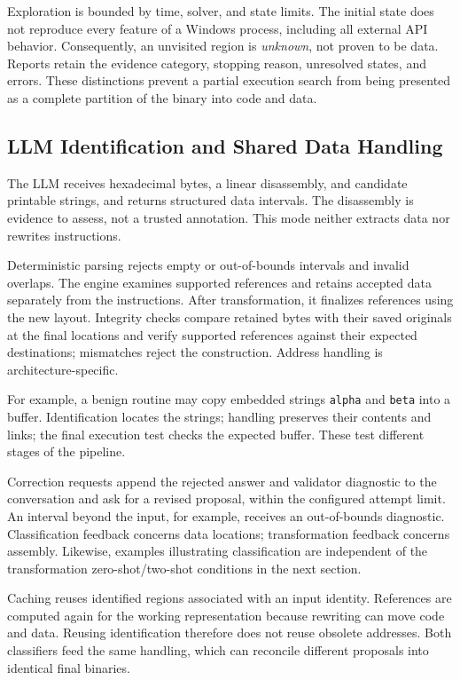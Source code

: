 Exploration is bounded by time, solver, and state limits. The initial state
does not reproduce every feature of a Windows process, including all
external API behavior. Consequently, an unvisited region is \emph{unknown},
not proven to be data. Reports retain the evidence category, stopping
reason, unresolved states, and errors. These distinctions prevent a
partial execution search from being presented as a complete partition of
the binary into code and data.

\subsection{LLM Identification and Shared Data Handling}
The LLM receives hexadecimal bytes, a linear disassembly, and candidate
printable strings, and returns structured data intervals. The disassembly
is evidence to assess, not a trusted annotation. This mode neither
extracts data nor rewrites instructions.

Deterministic parsing rejects empty or out-of-bounds intervals and invalid
overlaps. The engine examines supported references and retains accepted
data separately from the instructions. After transformation, it finalizes
references using the new layout. Integrity checks compare retained bytes
with their saved originals at the final locations and verify supported
references against their expected destinations; mismatches reject the
construction. Address handling is architecture-specific.

For example, a benign routine may copy embedded strings \texttt{alpha}
and \texttt{beta} into a buffer. Identification locates the strings;
handling preserves their contents and links; the final execution test
checks the expected buffer. These test different stages of the pipeline.

Correction requests append the rejected answer and validator diagnostic
to the conversation and ask for a revised proposal, within the configured
attempt limit. An interval beyond the input, for example, receives an
out-of-bounds diagnostic. Classification feedback concerns data locations;
transformation feedback concerns assembly. Likewise, examples illustrating
classification are independent of the transformation zero-shot/two-shot
conditions in the next section.

Caching reuses identified regions associated with an input identity.
References are computed again for the working representation because
rewriting can move code and data. Reusing identification therefore does
not reuse obsolete addresses. Both classifiers feed the same handling,
which can reconcile different proposals into identical final binaries.

